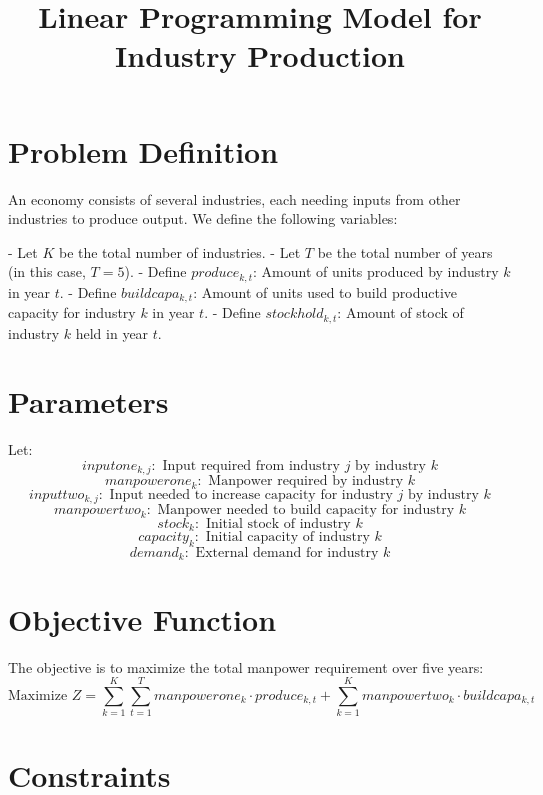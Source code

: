 \documentclass{article}
\begin{document}
\title{Linear Programming Model for Industry Production}
\author{}
\date{}
\maketitle

\section*{Problem Definition}

An economy consists of several industries, each needing inputs from other industries to produce output. We define the following variables:

- Let \( K \) be the total number of industries.
- Let \( T \) be the total number of years (in this case, \( T = 5 \)).
- Define \( produce_{k, t} \): Amount of units produced by industry \( k \) in year \( t \).
- Define \( buildcapa_{k, t} \): Amount of units used to build productive capacity for industry \( k \) in year \( t \).
- Define \( stockhold_{k, t} \): Amount of stock of industry \( k \) held in year \( t \).

\section*{Parameters}

Let:
\[
inputone_{k, j}: \text{ Input required from industry } j \text{ by industry } k
\]
\[
manpowerone_{k}: \text{ Manpower required by industry } k
\]
\[
inputtwo_{k, j}: \text{ Input needed to increase capacity for industry } j \text{ by industry } k
\]
\[
manpowertwo_{k}: \text{ Manpower needed to build capacity for industry } k
\]
\[
stock_{k}: \text{ Initial stock of industry } k
\]
\[
capacity_{k}: \text{ Initial capacity of industry } k
\]
\[
demand_{k}: \text{ External demand for industry } k
\]

\section*{Objective Function}

The objective is to maximize the total manpower requirement over five years:
\[
\text{Maximize } Z = \sum_{k=1}^{K} \sum_{t=1}^{T} manpowerone_{k} \cdot produce_{k, t} + \sum_{k=1}^{K} manpowertwo_{k} \cdot buildcapa_{k, t}
\]

\section*{Constraints}
\end{document}
